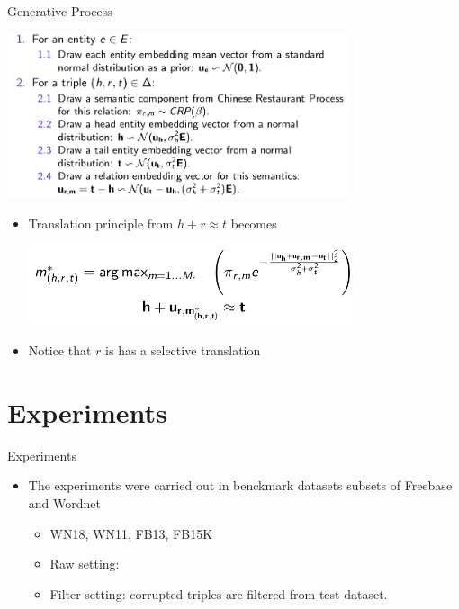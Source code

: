 \documentclass[xcolor={x11names,svgnames,dvipsnames},trans]{beamer}
\begin{document}
\begin{frame}{Generative Process}

    {\centering
    \includegraphics[width=0.75\textwidth]{images/algorithm.png}\par
    }

    \begin{center}
        \begin{minipage}{.8\textwidth}\rmfamily
            \begin{itemize}
                \item Translation principle from $ h + r \approx t$ becomes
                   {\includegraphics[width=0.75\textwidth]{images/geometrical.png}\par
                   }
                \item Notice that $r$ is has a selective translation
            \end{itemize}
        \end{minipage}
    \end{center}

\end{frame}

\section{Experiments}

\begin{frame}{Experiments}

    \begin{itemize}
        \item The experiments were carried out in benckmark datasets subsets of Freebase and Wordnet
        \begin{itemize}
            \item WN18, WN11, FB13, FB15K
            \item Raw setting:
            \item Filter setting: corrupted triples are filtered from test dataset.
        \end{itemize}
    \end{itemize}

\end{frame}
\end{document}

